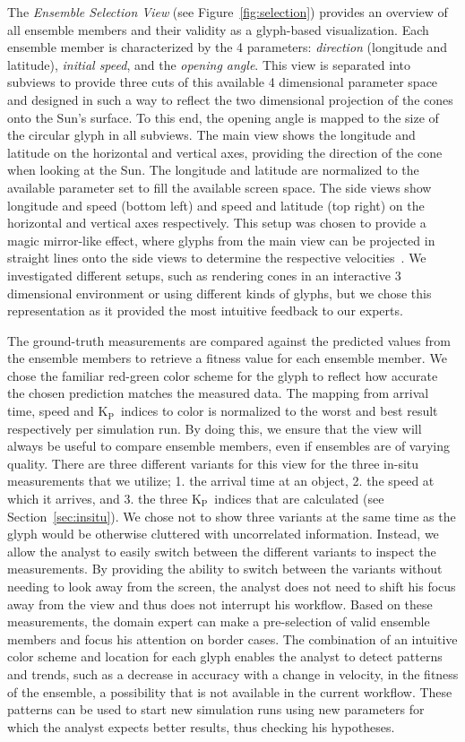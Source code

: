 \documentclass[journal]{vgtc}                %
\newcommand{\kpIndex}{$\textrm{K}_\textrm{P}$}
\begin{document}
The \emph{Ensemble Selection View} (see Figure~\ref{fig:selection}) provides an overview of all ensemble members and their validity as a glyph-based visualization. Each ensemble member is characterized by the 4 parameters: \emph{direction} (longitude and latitude), \emph{initial speed}, and the \emph{opening angle}. This view is separated into subviews to provide three cuts of this available 4 dimensional parameter space and designed in such a way to reflect the two dimensional projection of the cones onto the Sun's surface. To this end, the opening angle is mapped to the size of the circular glyph in all subviews. The main view shows the longitude and latitude on the horizontal and vertical axes, providing the direction of the cone when looking at the Sun. The longitude and latitude are normalized to the available parameter set to fill the available screen space. The side views show longitude and speed (bottom left) and speed and latitude (top right) on the horizontal and vertical axes respectively. This setup was chosen to provide a magic mirror-like effect, where glyphs from the main view can be projected in straight lines onto the side views to determine the respective velocities~\cite{konig1999multiple}. We investigated different setups, such as rendering cones in an interactive 3 dimensional environment or using different kinds of glyphs, but we chose this representation as it provided the most intuitive feedback to our experts.

The ground-truth measurements are compared against the predicted values from the ensemble members to retrieve a fitness value for each ensemble member. We chose the familiar red-green color scheme for the glyph to reflect how accurate the chosen prediction matches the measured data. The mapping from arrival time, speed and \kpIndex\ indices to color is normalized to the worst and best result respectively per simulation run. By doing this, we ensure that the view will always be useful to compare ensemble members, even if ensembles are of varying quality. There are three different variants for this view for the three in-situ measurements that we utilize; 1. the arrival time at an object, 2. the speed at which it arrives, and 3. the three \kpIndex\ indices that are calculated (see Section~\ref{sec:insitu}). We chose not to show three variants at the same time as the glyph would be otherwise cluttered with uncorrelated information. Instead, we allow the analyst to easily switch between the different variants to inspect the measurements. By providing the ability to switch between the variants without needing to look away from the screen, the analyst does not need to shift his focus away from the view and thus does not interrupt his workflow. Based on these measurements, the domain expert can make a pre-selection of valid ensemble members and focus his attention on border cases. The combination of an intuitive color scheme and location for each glyph enables the analyst to detect patterns and trends, such as a decrease in accuracy with a change in velocity, in the fitness of the ensemble, a possibility that is not available in the current workflow. These patterns can be used to start new simulation runs using new parameters for which the analyst expects better results, thus checking his hypotheses.
\end{document}
